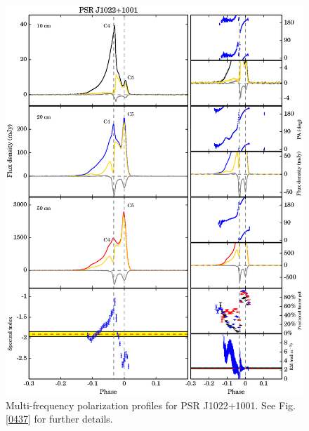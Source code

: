 \documentclass[useAMS,usenatbib]{mn2e}
\begin{document}
\begin{appendices}
\begin{figure}
\begin{center}
\includegraphics[width=6 in]{1022.ps}
\caption{Multi-frequency polarization profiles for PSR J1022$+$1001. 
See Fig. \ref{0437} for further details.}
\label{1022}
\end{center}
\end{figure}


\end{appendices}
\end{document}
